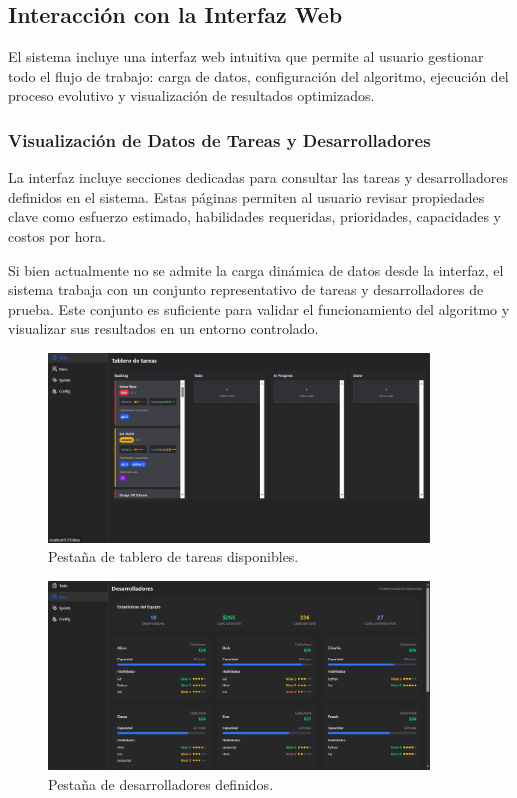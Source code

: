 
\subsection{Interacción con la Interfaz Web}

El sistema incluye una interfaz web intuitiva que permite al usuario gestionar todo el flujo de trabajo: carga de datos, configuración del algoritmo, ejecución del proceso evolutivo y visualización de resultados optimizados.

\subsubsection{Visualización de Datos de Tareas y Desarrolladores}
La interfaz incluye secciones dedicadas para consultar las tareas y desarrolladores definidos en el sistema. Estas páginas permiten al usuario revisar propiedades clave como esfuerzo estimado, habilidades requeridas, prioridades, capacidades y costos por hora.

Si bien actualmente no se admite la carga dinámica de datos desde la interfaz, el sistema trabaja con un conjunto representativo de tareas y desarrolladores de prueba. Este conjunto es suficiente para validar el funcionamiento del algoritmo y visualizar sus resultados en un entorno controlado.

\begin{figure}[htbp]
    \centering
\includegraphics[width=0.9\textwidth]{imagenes/web-tasks.png}
    \caption{Pestaña de tablero de tareas disponibles.}
    \label{fig:tareas}
\end{figure}

\begin{figure}[htbp]
    \centering
    \includegraphics[width=0.9\textwidth]{imagenes/web-devs.png}
    \caption{Pestaña de desarrolladores definidos.}
    \label{fig:desarrolladores}
\end{figure}

